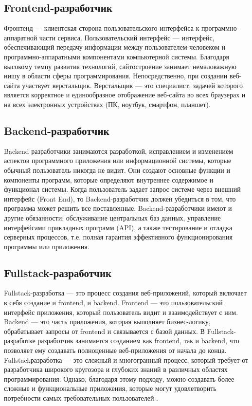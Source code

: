 \documentclass[referat, times]{SCWorks}
\begin{document}
\subsection{Frontend-разработчик}
Фронтенд --- клиентская сторона пользовательского интерфейса к
программно-аппаратной части сервиса.
Пользовательский интерфейс --- интерфейс, обеспечивающий передачу
информации между пользователем-человеком и программно-аппаратными
компонентами компьютерной системы.
Благодаря высокому темпу развития технологий, сайтостроение
занимает немаловажную нишу в области сферы программирования.
Непосредственно, при создании веб-сайта участвует верстальщик.
Верстальщик --- это специалист, задачей которого является корректное и
единообразное отображение веб-сайта во всех браузерах и на всех
электронных устройствах (ПК, ноутбук, смартфон, планшет)\cite{3}. 

\subsection{Backend-разработчик}
Backend разработчики занимаются разработкой, исправлением и
изменением аспектов программного приложения или информационной системы, которые
обычный пользователь никогда не видит. Они создают основные функции и компоненты
программ, которые определяют внутреннее содержимое и функционал системы.
Когда пользователь задает запрос системе через внешний интерфейс (Front End), то
Backend-разработчик должен убедиться в том, что программа может решить все
поставленные. Backend-разработчики имеют и другие обязанности: обслуживание
центральных баз данных, управление интерфейсами прикладных программ (API), а также
тестирование и отладка серверных процессов, т.е. полная гарантия эффективного
функционирования программы или приложения\cite{4}.

\subsection{Fullstack-разработчик}
Fullstack-разработка --- это процесс создания веб-приложений, который включает в себя
создание и frontend, и backend. Frontend --- это пользовательский интерфейс приложения,
который пользователь видит и взаимодействует с ним. Backend --- это часть приложения, которая
выполняет бизнес-логику, обрабатывает запросы от frontend и связывается с базой данных. В
Fullstack-разработке разработчик занимается созданием как frontend, так и backend, что
позволяет ему создавать полноценные веб-приложения от начала до конца. Fullstackразработка --- это сложный и многогранный процесс, который требует от разработчика широкого
кругозора и глубоких знаний в различных областях программирования. Однако, благодаря
этому подходу, можно создавать более сложные и функциональные приложения, которые
могут удовлетворить потребности самых требовательных пользователей \cite{5}.
\end{document}
